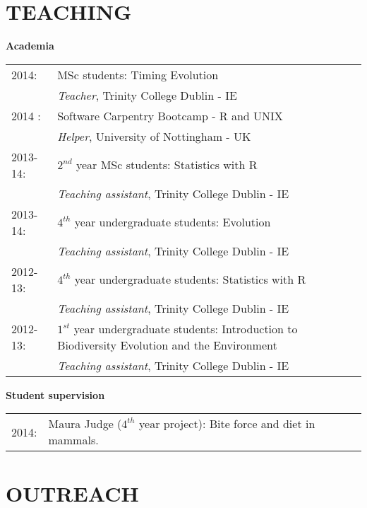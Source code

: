 \documentclass[10pt,a4paper]{article}
\begin{document}
{\section{TEACHING}
\bigskip

\raggedright\textbf{Academia}\\[1.5ex]
\begin{tabular}{ll}
2014: & MSc students: Timing Evolution \\
& \textit{Teacher}, Trinity College Dublin - IE \\
2014 : & Software Carpentry Bootcamp - R and UNIX \\
& \textit{Helper}, University of Nottingham - UK \\
2013-14: & $2^{nd}$ year MSc students: Statistics with R \\
& \textit{Teaching assistant}, Trinity College Dublin - IE \\
2013-14: & $4^{th}$ year undergraduate students: Evolution\\
& \textit{Teaching assistant}, Trinity College Dublin - IE\\
2012-13: & $4^{th}$ year undergraduate students: Statistics with R\\
& \textit{Teaching assistant}, Trinity College Dublin - IE\\
2012-13: & $1^{st}$ year undergraduate students: Introduction to Biodiversity Evolution and the Environment\\
& \textit{Teaching assistant}, Trinity College Dublin - IE\\
\end{tabular}
\raggedright\textbf{Student supervision}\\[1.5ex]
\begin{tabular}{ll}
2014: & Maura Judge ($4^{th}$ year project): Bite force and diet in mammals. \\
\end{tabular}
\bigskip

\section{OUTREACH}
\bigskip

}
\end{document}
